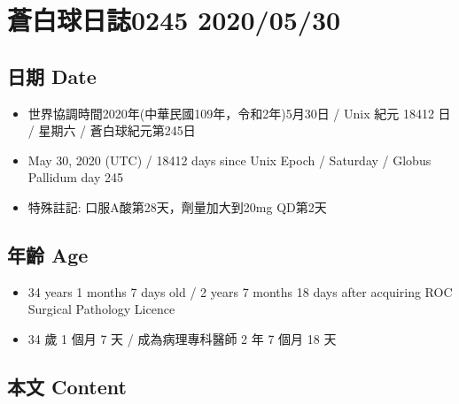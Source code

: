 \documentclass[a5paper, 11pt
]{book}
\providecommand{\tightlist}{%
  \setlength{\itemsep}{0pt}\setlength{\parskip}{0pt}}
\begin{document}
\hypertarget{ux84bcux767dux7403ux65e5ux8a8c0245-20200530}{%
\section{蒼白球日誌0245
2020/05/30}\label{ux84bcux767dux7403ux65e5ux8a8c0245-20200530}}

\hypertarget{ux65e5ux671f-date-90}{%
\subsection{日期 Date}\label{ux65e5ux671f-date-90}}

\begin{itemize}
\tightlist
\item
  世界協調時間2020年(中華民國109年，令和2年)5月30日 / Unix 紀元 18412 日
  / 星期六 / 蒼白球紀元第245日
\item
  May 30, 2020 (UTC) / 18412 days since Unix Epoch / Saturday / Globus
  Pallidum day 245
\item
  特殊註記: 口服A酸第28天，劑量加大到20mg QD第2天
\end{itemize}

\hypertarget{ux5e74ux9f61-age-90}{%
\subsection{年齡 Age}\label{ux5e74ux9f61-age-90}}

\begin{itemize}
\tightlist
\item
  34 years 1 months 7 days old / 2 years 7 months 18 days after
  acquiring ROC Surgical Pathology Licence
\item
  34 歲 1 個月 7 天 / 成為病理專科醫師 2 年 7 個月 18 天
\end{itemize}

\hypertarget{ux672cux6587-content-90}{%
\subsection{本文 Content}\label{ux672cux6587-content-90}}
\end{document}

